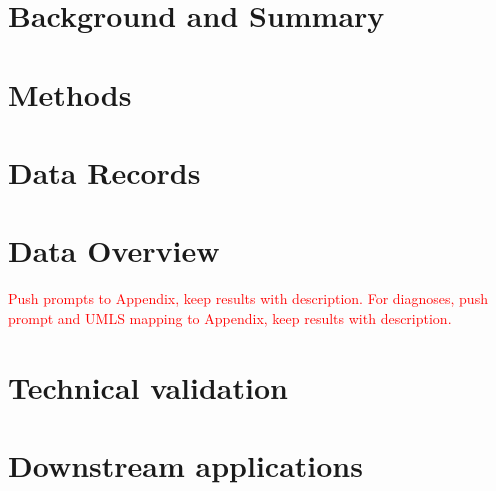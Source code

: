 \documentclass[pdflatex,sn-mathphys-num]{sn-jnl}%
\theoremstyle{thmstyleone}%
\theoremstyle{thmstyletwo}%
\theoremstyle{thmstylethree}%
\begin{document}

\maketitle


\vspace{-5mm}
\section{Background and Summary}\label{sec:intro}


\section{Methods}\label{sec:methods}


\section{Data Records}\label{sec:data_records}


\section{Data Overview}\label{sec:data_overview}
\textcolor{red}{Push prompts to Appendix, keep results with description. For diagnoses, push prompt and UMLS mapping to Appendix, keep results with description.}


\section{Technical validation} \label{sec:technical_validation}


\section{Downstream applications} \label{sec:downstream_applications}

\end{document}
